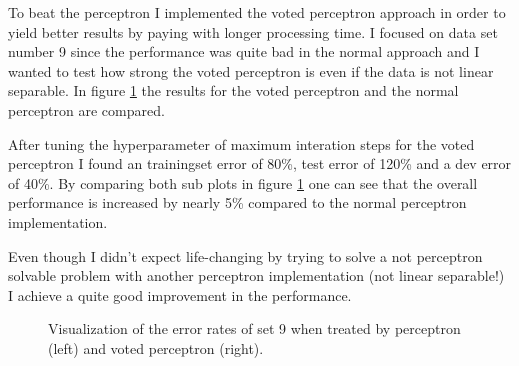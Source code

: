 \documentclass[12pt]{article}
\begin{document}
To beat the perceptron I implemented the voted perceptron approach in order to yield better results by paying with longer processing time. I focused on data set number 9 since the performance was quite bad in the normal approach and I wanted to test how strong the voted perceptron is even if the data is not linear separable. In figure \ref{fig:3.1} the results for the voted perceptron and the normal perceptron are compared.\par 
After tuning the hyperparameter of maximum interation steps for the voted perceptron I found an trainingset error of 80\%, test error of 120\% and a dev error of 40\%. By comparing both sub plots in figure \ref{fig:3.1} one can see that the overall performance is increased by nearly 5\% compared to the normal perceptron implementation. \par
Even though I didn't expect life-changing by trying to solve a not perceptron solvable problem with another perceptron implementation (not linear separable!) I achieve a quite good improvement in the performance. 

 
\begin{figure}[h!]
 	\centering
 	\hfill
 	\caption[]{Visualization of the error rates of set 9 when treated by perceptron (left) and voted perceptron (right). }
 	\label{fig:3.1}
\end{figure}
 
\end{document}
